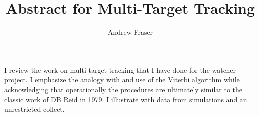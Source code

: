 \documentclass{article}
\title{Abstract for Multi-Target Tracking}
\author{Andrew Fraser}
\begin{document}
\maketitle
I review the work on multi-target tracking that I have done for the
watcher project.  I emphasize the analogy with and use of the Viterbi
algorithm while acknowledging that operationally the procedures are
ultimately similar to the classic work of DB Reid in 1979.  I
illustrate with data from simulations and an unrestricted collect.
\end{document}
